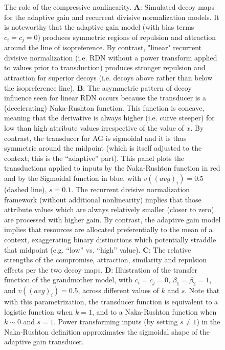 \documentclass[a4paper, nobind]{templates/ociamthesis}
\begin{document}
\begin{figure}
\caption[Normalization with compressed inputs]{The role of the compressive nonlinearity. $\textbf{A:}$ Simulated decoy maps for the adaptive gain and recurrent divisive normalization models. It is noteworthy that the adaptive gain model (with bias terms $c_i=c_j=0$) produces symmetric regions of repulsion and attraction around the line of isopreference. By contrast, "linear" recurrent divisive normalization (i.e. RDN without a power transform applied to values prior to transduction) produces stronger repulsion and attraction for superior decoys (i.e. decoys above rather than below the isopreference line). $\textbf{B:}$ The asymmetric pattern of decoy influence seen for linear RDN occurs because the transducer is a (decelerating) Naka-Rushton function. This function is concave, meaning that the derivative is always higher (i.e. curve steeper) for low than high attribute values irrespective of the value of $x$. By contrast, the transducer for AG is sigmoidal and it is thus symmetric around the midpoint (which is itself adjusted to the context; this is the “adaptive” part). This panel plots the transductions applied to inputs by the Naka-Rushton function in red and by the Sigmoidal function in blue, with $v((avg)_i)=0.5$ (dashed line), $s=0.1$. The recurrent divisive normalization framework (without additional nonlinearity) implies that those attribute values which are always relatively smaller (closer to zero) are processed with higher gain. By contrast, the adaptive gain model implies that resources are allocated preferentially to the mean of a context, exaggerating binary distinctions which potentially straddle that midpoint (e.g. “low” vs. “high” value). $\textbf{C:}$ The relative strengths of the compromise, attraction, similarity and repulsion effects per the two decoy maps. $\textbf{D:}$ Illustration of the transfer function of the grandmother model, with $c_i=c_j=0$, $\beta_1=\beta_2=1$, and $v((avg)_i)=0.5$, across different values of $k$ and $s$. Note that with this parametrization, the transducer function is equivalent to a logistic function when $k=1$, and to a Naka-Rushton function when $k \sim 0$ and $s=1$. Power transforming inputs (by setting $s \neq 1$) in the Naka-Rushton definition approximates the sigmoidal shape of the adaptive gain transducer.}\label{fig:decoy-nonlinearity}
\end{figure}
\end{document}
